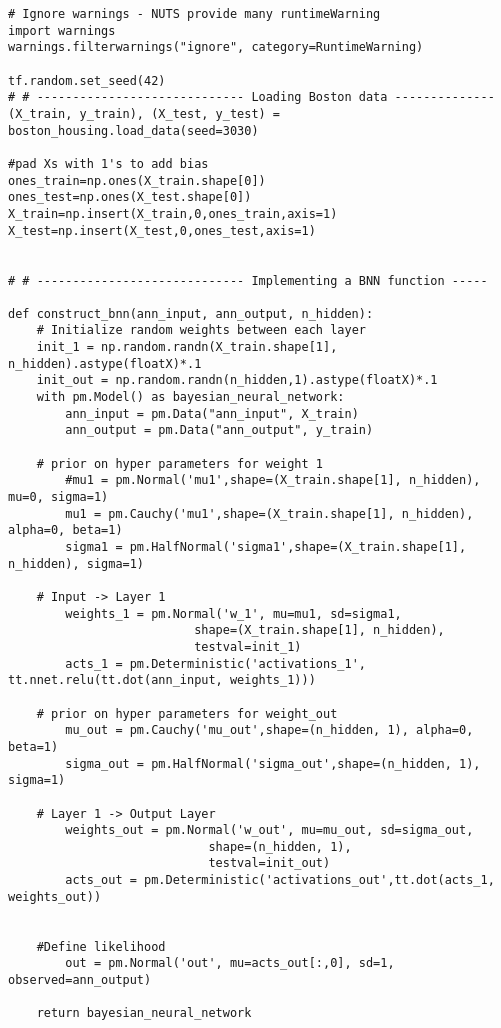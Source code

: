 \begin{appendices}
\begin{lstlisting}
# Ignore warnings - NUTS provide many runtimeWarning
import warnings
warnings.filterwarnings("ignore", category=RuntimeWarning)

tf.random.set_seed(42)
# # ----------------------------- Loading Boston data --------------
(X_train, y_train), (X_test, y_test) = boston_housing.load_data(seed=3030)

#pad Xs with 1's to add bias
ones_train=np.ones(X_train.shape[0])
ones_test=np.ones(X_test.shape[0])
X_train=np.insert(X_train,0,ones_train,axis=1)
X_test=np.insert(X_test,0,ones_test,axis=1)


# # ----------------------------- Implementing a BNN function -----

def construct_bnn(ann_input, ann_output, n_hidden):
    # Initialize random weights between each layer
    init_1 = np.random.randn(X_train.shape[1], n_hidden).astype(floatX)*.1
    init_out = np.random.randn(n_hidden,1).astype(floatX)*.1
    with pm.Model() as bayesian_neural_network:
        ann_input = pm.Data("ann_input", X_train)
        ann_output = pm.Data("ann_output", y_train)
      
    # prior on hyper parameters for weight 1
        #mu1 = pm.Normal('mu1',shape=(X_train.shape[1], n_hidden), mu=0, sigma=1)
        mu1 = pm.Cauchy('mu1',shape=(X_train.shape[1], n_hidden), alpha=0, beta=1)
        sigma1 = pm.HalfNormal('sigma1',shape=(X_train.shape[1], n_hidden), sigma=1) 
        
    # Input -> Layer 1
        weights_1 = pm.Normal('w_1', mu=mu1, sd=sigma1,
                          shape=(X_train.shape[1], n_hidden),
                          testval=init_1)
        acts_1 = pm.Deterministic('activations_1', tt.nnet.relu(tt.dot(ann_input, weights_1)))
    
    # prior on hyper parameters for weight_out 
        mu_out = pm.Cauchy('mu_out',shape=(n_hidden, 1), alpha=0, beta=1)
        sigma_out = pm.HalfNormal('sigma_out',shape=(n_hidden, 1), sigma=1) 
    
    # Layer 1 -> Output Layer
        weights_out = pm.Normal('w_out', mu=mu_out, sd=sigma_out,
                            shape=(n_hidden, 1),
                            testval=init_out)
        acts_out = pm.Deterministic('activations_out',tt.dot(acts_1, weights_out))
        

    #Define likelihood
        out = pm.Normal('out', mu=acts_out[:,0], sd=1, observed=ann_output)        
            
    return bayesian_neural_network



\end{lstlisting}
\end{appendices}
